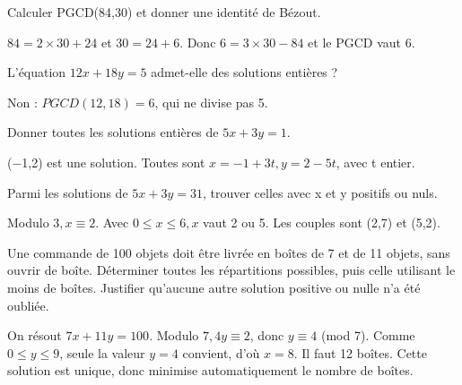 \documentclass[11pt]{article}
\begin{document}
Calculer PGCD(84,30) et donner une identité de Bézout.\par
\(84 = 2 \times  30 + 24\) et \(30 = 24 + 6\). Donc \(6 = 3 \times  30 - 84\) et le PGCD vaut 6.\par
{}
L’équation \(12x + 18y = 5\) admet-elle des solutions entières ?\par
Non : \(PGCD(12,18) = 6\), qui ne divise pas 5.\par
{}
Donner toutes les solutions entières de \(5x + 3y = 1\).\par
(−1,2) est une solution. Toutes sont \(x = -1 + 3t, y = 2 - 5t\), avec t entier.\par
{}
Parmi les solutions de \(5x + 3y = 31\), trouver celles avec x et y positifs ou nuls.\par
Modulo \(3, x \equiv  2\). Avec \(0 \leq  x \leq  6, x\) vaut 2 ou 5. Les couples sont (2,7) et (5,2).\par
{}
Une commande de 100 objets doit être livrée en boîtes de 7 et de 11 objets, sans ouvrir de boîte. Déterminer toutes les répartitions possibles, puis celle utilisant le moins de boîtes. Justifier qu’aucune autre solution positive ou nulle n’a été oubliée.\par
On résout \(7x + 11y = 100\). Modulo \(7, 4y \equiv  2\), donc \(y \equiv  4\) (mod 7). Comme \(0 \leq  y \leq  9\), seule la valeur \(y = 4\) convient, d’où \(x = 8\). Il faut 12 boîtes. Cette solution est unique, donc minimise automatiquement le nombre de boîtes.\par
\end{document}
